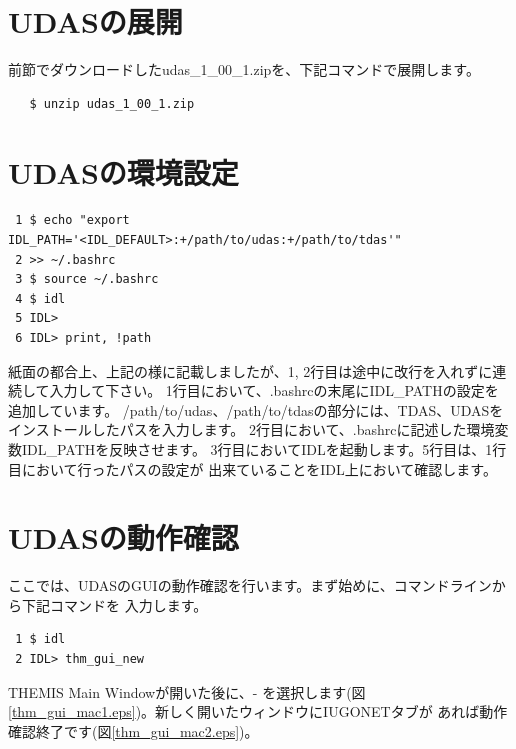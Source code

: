 \documentclass[a4j]{jbook}
\begin{document}
\section{UDASの展開}
前節でダウンロードしたudas\_1\_00\_1.zipを、下記コマンドで展開します。
\begin{screen}
\begin{verbatim}
   $ unzip udas_1_00_1.zip
\end{verbatim}
\end{screen}

\section{UDASの環境設定}

\begin{screen}
\begin{verbatim}
 1 $ echo "export IDL_PATH='<IDL_DEFAULT>:+/path/to/udas:+/path/to/tdas'" 
 2 >> ~/.bashrc
 3 $ source ~/.bashrc
 4 $ idl
 5 IDL>
 6 IDL> print, !path
\end{verbatim}
\end{screen}
紙面の都合上、上記の様に記載しましたが、1, 2行目は途中に改行を入れずに連続して入力して下さい。
1行目において、.bashrcの末尾にIDL\_PATHの設定を追加しています。
/path/to/udas、/path/to/tdasの部分には、TDAS、UDASをインストールしたパスを入力します。
2行目において、.bashrcに記述した環境変数IDL\_PATHを反映させます。
3行目においてIDLを起動します。5行目は、1行目において行ったパスの設定が
出来ていることをIDL上において確認します。\par

\section{UDASの動作確認}

ここでは、UDASのGUIの動作確認を行います。まず始めに、コマンドラインから下記コマンドを
入力します。
\begin{screen}
\begin{verbatim}
 1 $ idl
 2 IDL> thm_gui_new
\end{verbatim}
\end{screen}
THEMIS Main Windowが開いた後に、-
を選択します(図\ref{thm_gui_mac1.eps})。新しく開いたウィンドウにIUGONETタブが
あれば動作確認終了です(図\ref{thm_gui_mac2.eps})。
\end{document}
